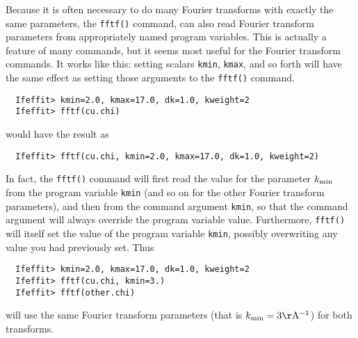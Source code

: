 \documentclass[11pt]{article}
\begin{document}
Because it is often necessary to do many Fourier transforms with exactly
the same parameters, the {\tt{fftf()}} command, can also read Fourier
transform parameters from appropriately named program variables.  This is
actually a feature of many commands, but it seems most useful for the
Fourier transform commands.  It works like this: setting scalars
{\tt{kmin}},  {\tt{kmax}}, and so forth will have the same effect as
setting those arguments to the {\tt{fftf()}} command. 
{\small\begin{verbatim}
  Ifeffit> kmin=2.0, kmax=17.0, dk=1.0, kweight=2
  Ifeffit> fftf(cu.chi)
\end{verbatim}
}\noindent
would have the result as
{\small\begin{verbatim}
  Ifeffit> fftf(cu.chi, kmin=2.0, kmax=17.0, dk=1.0, kweight=2)
\end{verbatim}
}\noindent
In fact, the {\tt{fftf()}} command will first read the value for the
parameter $k_{\rm min}$ from the program variable {\tt{kmin}} (and so on
for the other Fourier transform parameters), and then from the command
argument {\tt{kmin}}, so that the command argument will always override the
program variable value.  Furthermore, {\tt{fftf()}} will itself set the
value of the program variable {\tt{kmin}}, possibly overwriting any value
you had previously set.   Thus
{\small\begin{verbatim}
  Ifeffit> kmin=2.0, kmax=17.0, dk=1.0, kweight=2
  Ifeffit> fftf(cu.chi, kmin=3.)
  Ifeffit> fftf(other.chi)
\end{verbatim}
}\noindent
will use the same Fourier transform parameters (that is $k_{\rm min} =
3\rm\AA^{-1}$) for both transforms.
\end{document}
